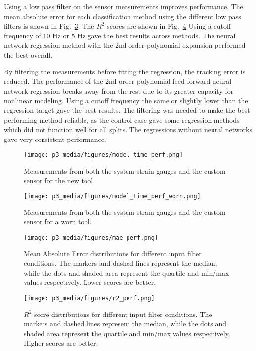 Using a low pass filter on the sensor measurements improves performance. 
The mean absolute error for each classification method using the different low pass filters is shown in 
Fig.~\ref{fig:MAE}. The $R^2$ scores are shown in Fig.~\ref{fig:adjr2}
Using a cutoff frequency of 10 Hz or 5 Hz gave the best results across methods.
The neural network regression method with the 2nd order polynomial expansion performed the best overall.

By filtering the measurements before fitting the regression, 
the tracking error is reduced.
The performance of the 2nd order polynomial feed-forward neural network
regression breaks away from the rest due to its greater capacity for nonlinear modeling.
Using a cutoff frequency the same or slightly lower than the regression target gave 
the best results.
The filtering was needed to make the best performing method reliable, as the control case
gave some regression methods which did not function well for all splits.
The regressions without neural networks gave very consistent performance.

\begin{figure}[]
\centering
\texttt{[image: p3\_media/figures/model\_time\_perf.png]}
\caption{
Measurements from both the system strain gauges and the custom sensor for the new tool. 
}
\label{fig:sensor_rock_cut}
\end{figure}

\begin{figure}[]
\centering
\texttt{[image: p3\_media/figures/model\_time\_perf\_worn.png]}
\caption{
Measurements from both the system strain gauges and the custom sensor for a worn tool. 
}
\label{fig:sensor_rock_cut_worn}
\end{figure}

\begin{figure}[]
\centering
\texttt{[image: p3\_media/figures/mae\_perf.png]}
\caption{
Mean Absolute Error distributions for different input filter conditions.
The markers and dashed lines represent the median, while the dots and shaded area represent
the quartile and min/max values respectively. Lower scores are better.
}
\label{fig:MAE}
\end{figure}

\begin{figure}[]
\centering
\texttt{[image: p3\_media/figures/r2\_perf.png]}
\caption{
$R^2$ score distributions for different input filter conditions.
The markers and dashed lines represent the median, while the dots and shaded area represent
the quartile and min/max values respectively. Higher scores are better.
} 
\label{fig:adjr2}
\end{figure}

